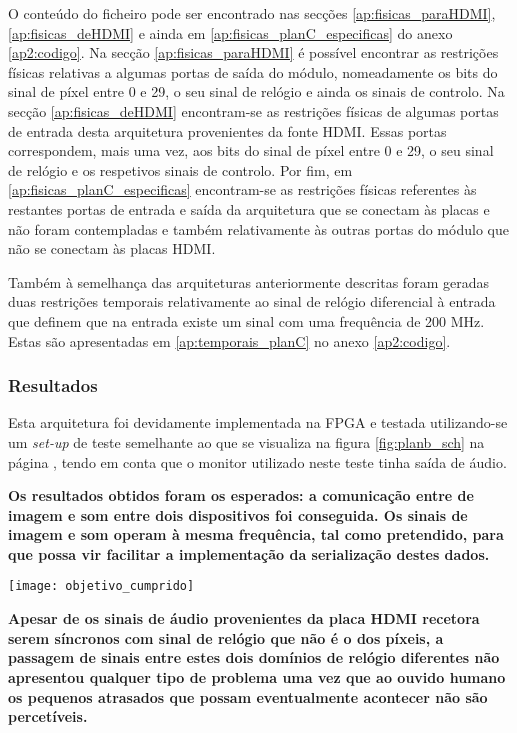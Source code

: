 O conteúdo do ficheiro pode ser encontrado nas secções \ref{ap:fisicas_paraHDMI}, \ref{ap:fisicas_deHDMI} e ainda em \ref{ap:fisicas_planC_especificas} do anexo \ref{ap2:codigo}. Na secção \ref{ap:fisicas_paraHDMI} é possível encontrar as restrições físicas relativas a algumas portas de saída do módulo, nomeadamente os bits do sinal de píxel entre 0 e 29, o seu sinal de relógio e ainda os sinais de controlo. Na secção \ref{ap:fisicas_deHDMI} encontram-se as restrições físicas de algumas portas de entrada desta arquitetura provenientes da fonte HDMI. Essas portas correspondem, mais uma vez, aos bits do sinal de píxel entre 0 e 29, o seu sinal de relógio e os respetivos sinais de controlo. Por fim, em \ref{ap:fisicas_planC_especificas} encontram-se as restrições físicas referentes às restantes portas de entrada e saída da arquitetura que se conectam às placas e não foram contempladas e também relativamente às outras portas do módulo que não se conectam às placas HDMI. 

Também à semelhança das arquiteturas anteriormente descritas foram geradas duas restrições temporais relativamente ao sinal de relógio diferencial à entrada que definem que na entrada existe um sinal com uma frequência de 200 MHz. Estas são apresentadas em \ref{ap:temporais_planC} no anexo \ref{ap2:codigo}.

\subsubsection*{Resultados}



Esta arquitetura foi devidamente implementada na FPGA e testada utilizando-se um \textit{set-up} de teste semelhante ao que se visualiza na figura \ref{fig:planb_sch} na página \pageref{fig:planb_sch}, tendo em conta que o monitor utilizado neste teste tinha saída de áudio. 


\textbf{Os resultados obtidos foram os esperados: a comunicação entre de imagem e som entre dois dispositivos foi conseguida. Os sinais de imagem e som operam à mesma frequência, tal como pretendido, para que possa vir facilitar a implementação da serialização destes dados.}
\begin{marginfigure}
	\hspace*{0.75in}
	\texttt{[image: objetivo\_cumprido]}
\end{marginfigure}

\textbf{Apesar de os sinais de áudio provenientes da placa HDMI recetora serem síncronos com sinal de relógio que não é o dos píxeis, a passagem de sinais entre estes dois domínios de relógio diferentes não apresentou qualquer tipo de problema uma vez que ao ouvido humano os pequenos atrasados que possam eventualmente acontecer não são percetíveis. }